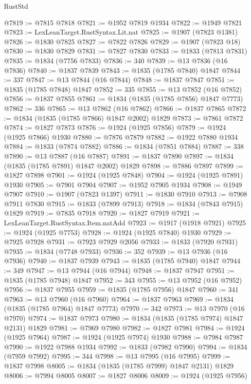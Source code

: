 \begin{lexlean}{RustStd}
\begin{coremodule}
@7819 := @7815 @7818
@7821 := @1952 @7819 @1934
@7822 := @1949 @7821
@7823 := LexLeanTarget.RustSyntax.Lit.nat
@7825 := @1907 (@7823 @1381)
@7826 := @1830 @7825
@7827 := @7822 @7826
@7829 := @1907 (@7823 @18)
@7830 := @1830 @7829
@7831 := @7827 @7830
@7833 := @1833 (@7813 @7831)
@7835 := @1834 (@7756 @7833)
@7836 := 340
@7839 := @13 @7836 (@16 @7836)
@7840 := @1837 @7839
@7843 := @1835 (@1785 @7840) @1847
@7844 := 337
@7847 := @13 @7844 (@16 @7844)
@7848 := @1837 @7847
@7851 := @1835 (@1785 @7848) @1847
@7852 := 335
@7855 := @13 @7852 (@16 @7852)
@7856 := @1837 @7855
@7861 := @1834 (@1835 (@1785 @7856) @1847 @7773)
@7862 := 336
@7865 := @13 @7862 (@16 @7862)
@7866 := @1837 @7865
@7872 := @1834 (@1835 (@1785 @7866) @1847 @2002) @1829
@7873 := @7861 @7872
@7874 := @1827 @7873
@7876 := @1924 (@1925 @7856)
@7879 := @1924 (@1925 @7866) @1930
@7880 := @7876 @7879
@7882 := @1922 @7880 @1934
@7884 := @1833 (@7874 @7882)
@7886 := @1834 (@7851 @7884)
@7887 := 338
@7890 := @13 @7887 (@16 @7887)
@7891 := @1837 @7890
@7897 := @1834 (@1835 (@1785 @7891) @1847 @2002) @1829
@7898 := @7886 @7897
@7899 := @1827 @7898
@7901 := @1924 (@1925 @7848)
@7904 := @1924 (@1925 @7891) @1930
@7905 := @7901 @7904
@7907 := @1952 @7905 @1934
@7908 := @1949 @7907
@7910 := @1907 (@7823 @1397)
@7911 := @1830 @7910
@7913 := @7908 @7911 @7830
@7915 := @1833 (@7899 @7913)
@7918 := @1834 (@7843 @7915) @1829
@7919 := @7835 @7918
@7920 := @1827 @7919
@7921 := LexLeanTarget.RustSyntax.Item.natAdd
@7923 := @1917 (@1918 @7921)
@7925 := @1924 (@1925 @7753)
@7928 := @1924 (@1925 @7840) @1930
@7929 := @7925 @7928
@7931 := @7923 @7929 @2056
@7933 := @1833 (@7920 @7931)
@7935 := @1834 (@7748 @7933)
@7936 := 352
@7939 := @13 @7936 (@16 @7936)
@7940 := @1837 @7939
@7943 := @1835 (@1785 @7940) @1847
@7944 := 349
@7947 := @13 @7944 (@16 @7944)
@7948 := @1837 @7947
@7951 := @1835 (@1785 @7948) @1847
@7952 := 343
@7955 := @13 @7952 (@16 @7952)
@7956 := @1837 @7955
@7959 := @1835 (@1785 @7956) @1847
@7960 := 341
@7963 := @13 @7960 (@16 @7960)
@7964 := @1837 @7963
@7969 := @1834 (@1835 (@1785 @7964) @1847 @7773)
@7970 := 342
@7973 := @13 @7970 (@16 @7970)
@7974 := @1837 @7973
@7980 := @1834 (@1835 (@1785 @7974) @1847 @2131) @1829
@7981 := @7969 @7980
@7982 := @1827 @7981
@7984 := @1924 (@1925 @7964)
@7987 := @1924 (@1925 @7974) @1930
@7988 := @7984 @7987
@7990 := @1922 @7988 @1934
@7992 := @1833 (@7982 @7990)
@7994 := @1834 (@7959 @7992)
@7995 := 344
@7998 := @13 @7995 (@16 @7995)
@7999 := @1837 @7998
@8005 := @1834 (@1835 (@1785 @7999) @1847 @2131) @1829
@8006 := @7994 @8005
@8007 := @1827 @8006
@8009 := @1924 (@1925 @7956)

\end{coremodule}
\end{lexlean}
